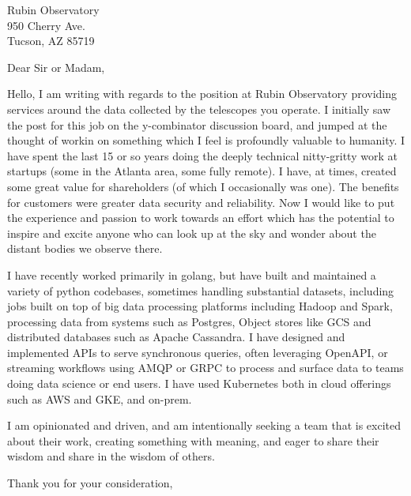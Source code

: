 \documentclass[letterpaper]{letter}
\begin{document}
\begin{letter}  {Rubin Observatory \\950 Cherry Ave. \\Tucson, AZ 85719}

\opening{Dear Sir or Madam,}

Hello, I am writing with regards to the position at Rubin Observatory providing
services around the data collected by the telescopes you operate. I initially
saw the post for this job on the y-combinator discussion board, and jumped at
the thought of workin on something which I feel is profoundly valuable to
humanity. I have spent the last 15 or so years doing the deeply technical
nitty-gritty work at startups (some in the Atlanta area, some fully remote). I
have, at times, created some great value for shareholders (of which I
occasionally was one).  The benefits for customers were greater data security
and reliability.  Now I would like to put the experience and passion to work
towards an effort which has the potential to inspire and excite anyone who can
look up at the sky and wonder about the distant bodies we observe there.

I have recently worked primarily in golang, but have built and maintained a
variety of python codebases, sometimes handling substantial datasets, including
jobs built on top of big data processing platforms including Hadoop and Spark,
processing data from systems such as Postgres, Object stores like GCS and
distributed databases such as Apache Cassandra. I have designed and implemented
APIs to serve synchronous queries, often leveraging OpenAPI, or streaming
workflows using AMQP or GRPC to process and surface data to teams doing data
science or end users. I have used Kubernetes both in cloud offerings such as
AWS and GKE, and on-prem.

I am opinionated and driven, and am intentionally seeking a team that is excited
about their work, creating something with meaning, and eager to share their wisdom
and share in the wisdom of others.

\closing{Thank you for your consideration,}

\end{letter}
\end{document}
